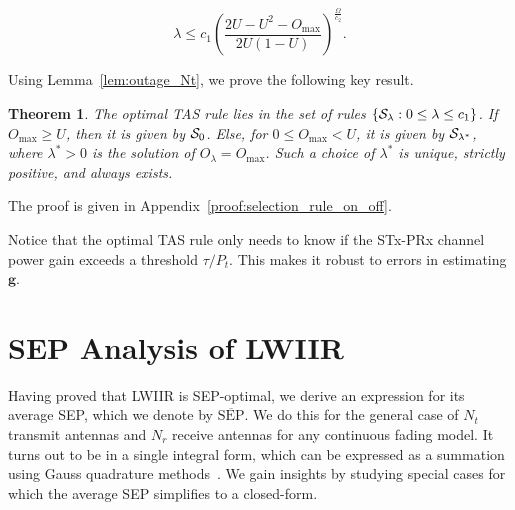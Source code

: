 \documentclass[12pt,draftcls,peerreview,onecolumn]{IEEEtran}
\newtheorem{theorem}{{\bf Theorem}}
\newcommand{\set}[1]{\{#1\}}
\newcommand{\tendsto}{\to}
\newcommand{\SEP}{\text{SEP}}
\newcommand{\lam}{\lambda}
\newcommand{\lamstar}{\lam^{*}}
\newcommand{\Nt}{{N_t}}
\newcommand{\Nr}{{N_r}}
\newcommand{\Pt}{{P_t}}
\newcommand{\puch}{g}
\newcommand{\g}{\mathbf{\puch}}
\newcommand{\outmax}{O_{\text{max}}}
\newcommand{\cone}{c_{1}}
\newcommand{\ctwo}{c_{2}}
\newcommand{\out}{O}
\newcommand{\al}{\ctwo}
\newcommand{\snr}{\Omega}
\newcommand{\snrbyal}[1][]{\frac{\snr#1}{\al}}
\newcommand{\un}{U}
\newcommand{\caluncons}{{\cal S_{\text{0}}}}
\newcommand{\callamrule}{{\cal S_{{\lam}}}}
\newcommand{\outlam}{\out_{\lam}}
\newcommand{\callamstarrule}{\cal S_{\lam^{*}}}
\newcommand{\avgSEP}{\overline{\SEP}}
\begin{document}
\begin{equation}
\label{eq:two_Nt_lam}
\lam \leq \cone \left( \frac{2\un - \un^2 - \outmax}{2\un(1-\un)} \right)^{\snrbyal[]}.
\end{equation} 

Using Lemma~\ref{lem:outage_Nt}, we prove the following key result. 
%
\begin{theorem}
\label{thm:selection_rule_on_off}
The optimal TAS rule lies in the set of rules $\set{\callamrule:0\leq\lam\leq\cone}$. If $\outmax\geq\un$, then it is given by $\caluncons$. Else, for $0\leq\outmax<\un$, it is given by $\callamstarrule$, where $\lamstar>0$  is the solution of $\outlam=\outmax$. Such a choice of $\lamstar$ is unique, strictly positive, and always exists. 
\end{theorem}
%                
\begin{IEEEproof}
   The proof is given in Appendix~\ref{proof:selection_rule_on_off}.
\end{IEEEproof}
%

Notice that the optimal TAS rule only needs to know if the STx-PRx channel power gain exceeds a threshold $\tau/\Pt$. This makes it robust to errors in estimating $\g$. 

\section{SEP Analysis of LWIIR}
\label{sec:SEPanalysis}
 Having proved that LWIIR is SEP-optimal, we derive an expression for its average SEP, which we denote by  $\avgSEP$. We do this for the general case of $\Nt$ transmit antennas and $\Nr$ receive antennas for any continuous fading model. It turns out to be in a single integral form, which can be expressed as a summation using Gauss quadrature methods~\cite{abramowitz_stegun}. We gain insights by studying special cases for which the average SEP simplifies to a closed-form. %
 
\end{document}
